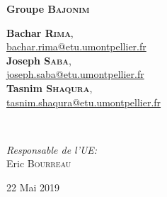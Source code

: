 \documentclass[12pt,a4paper]{report}
\begin{document}
\begin{titlepage}
{ \huge \bfseries Groupe \textsc{Bajonim}}\\[0.4cm]
\begin{minipage}{0.4\textwidth}
\centering \small
\textbf{Bachar \textsc{Rima}}, \\ \href{mailto:bachar.rima@etu.umontpellier.fr}{bachar.rima@etu.umontpellier.fr}\\ %
\textbf{Joseph \textsc{Saba}}, \\ \href{mailto:joseph.saba@etu.umontpellier.fr}{joseph.saba@etu.umontpellier.fr}\\ %
\textbf{Tasnim \textsc{Shaqura}}, \\ \href{mailto:tasnim.shaqura@etu.umontpellier.fr}{tasnim.shaqura@etu.umontpellier.fr}\\ %
\end{minipage} \\[0.8cm]

\begin{center}

\emph{Responsable de l'UE:} \\
Eric \textsc{Bourreau} %
\end{center}

{\large 22 Mai 2019}\\[1cm]
\hspace{\fill}
\vfill %
\end{titlepage}

\tableofcontents
\end{document}

